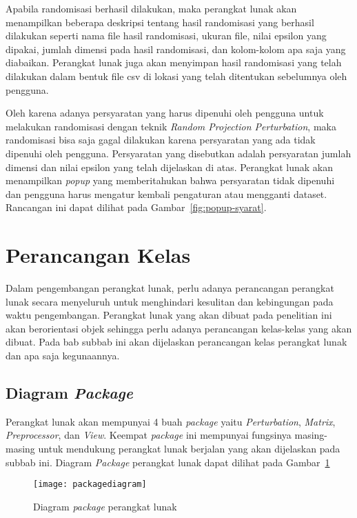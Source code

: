 Apabila randomisasi berhasil dilakukan, maka perangkat lunak akan menampilkan beberapa deskripsi tentang hasil randomisasi yang berhasil dilakukan seperti nama file hasil randomisasi, ukuran file, nilai epsilon yang dipakai, jumlah dimensi pada hasil randomisasi, dan kolom-kolom apa saja yang diabaikan. Perangkat lunak juga akan menyimpan hasil randomisasi yang telah dilakukan dalam bentuk file csv di lokasi yang telah ditentukan sebelumnya oleh pengguna.

Oleh karena adanya persyaratan yang harus dipenuhi oleh pengguna untuk melakukan randomisasi dengan teknik \textit{Random Projection Perturbation}, maka randomisasi bisa saja gagal dilakukan karena persyaratan yang ada tidak dipenuhi oleh pengguna. Persyaratan yang disebutkan adalah persyaratan jumlah dimensi dan nilai epsilon yang telah dijelaskan di atas. Perangkat lunak akan menampilkan \textit{popup} yang memberitahukan bahwa persyaratan tidak dipenuhi dan pengguna harus mengatur kembali pengaturan atau mengganti dataset. Rancangan ini dapat dilihat pada Gambar~\ref{fig:popup-syarat}.

\section{Perancangan Kelas}
\label{sec:kelas}

Dalam pengembangan perangkat lunak, perlu adanya perancangan perangkat lunak secara menyeluruh untuk menghindari kesulitan dan kebingungan pada waktu pengembangan. Perangkat lunak yang akan dibuat pada penelitian ini akan berorientasi objek sehingga perlu adanya perancangan kelas-kelas yang akan dibuat. Pada bab subbab ini akan dijelaskan perancangan kelas perangkat lunak dan apa saja kegunaannya.

\subsection{Diagram \textit{Package}}
\label{sec:diagram-package}

Perangkat lunak akan mempunyai 4 buah \textit{package} yaitu \textit{Perturbation}, \textit{Matrix}, \textit{Preprocessor}, dan \textit{View}. Keempat \textit{package} ini mempunyai fungsinya masing-masing untuk mendukung perangkat lunak berjalan yang akan dijelaskan pada subbab ini. Diagram \textit{Package} perangkat lunak dapat dilihat pada Gambar~\ref{fig:packagediagram}

\begin{figure}
	\centering
	\texttt{[image: packagediagram]}
	\caption{Diagram \textit{package} perangkat lunak}
	\label{fig:packagediagram}
\end{figure}

